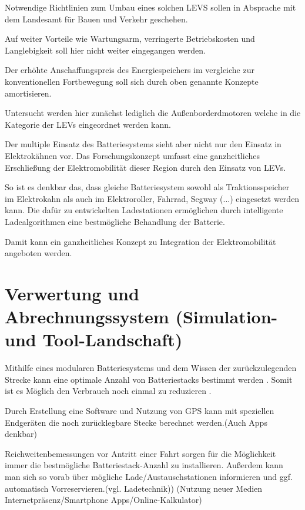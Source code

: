 Notwendige Richtlinien zum Umbau eines solchen LEVS sollen in Absprache mit dem Landesamt für Bauen und Verkehr geschehen. 

Auf weiter Vorteile wie Wartungsarm, verringerte Betriebskosten und Langlebigkeit soll hier nicht weiter eingegangen werden. 

Der erhöhte Anschaffungspreis des Energiespeichers im vergleiche zur konventionellen Fortbewegung soll sich durch oben genannte Konzepte amortisieren.

Untersucht werden hier zunächst lediglich die Außenborderdmotoren welche in die Kategorie der LEVs eingeordnet werden kann.

Der multiple Einsatz des Batteriesystems sieht aber nicht nur den Einsatz in Elektrokähnen vor.
Das Forschungskonzept umfasst eine ganzheitliches Erschließung der Elektromobilität dieser Region durch den Einsatz von LEVs.

So ist es denkbar das, dass gleiche Batteriesystem sowohl als Traktionsspeicher im Elektrokahn als auch im Elektroroller, Fahrrad, Segway (...) eingesetzt werden kann. Die dafür zu entwickelten Ladestationen ermöglichen durch intelligente Ladealgorithmen eine bestmögliche Behandlung der Batterie. 

Damit kann ein ganzheitliches Konzept zu Integration der Elektromobilität angeboten werden.


\section{Verwertung und Abrechnungssystem (Simulation- und Tool-Landschaft)}

Mithilfe eines modularen Batteriesystems und dem  Wissen der zurückzulegenden Strecke kann eine optimale Anzahl von Batteriestacks bestimmt werden . Somit ist es Möglich den Verbrauch noch einmal zu reduzieren . %

Durch Erstellung eine Software und Nutzung von GPS kann mit speziellen Endgeräten die noch zurücklegbare Stecke berechnet werden.(Auch Apps denkbar)

Reichweitenbemessungen vor Antritt einer Fahrt sorgen für die Möglichkeit immer die bestmögliche Batteriestack-Anzahl zu installieren. Außerdem kann man sich so vorab über mögliche Lade/Austauschstationen informieren und ggf. automatisch Vorreservieren.(vgl. Ladetechnik)) (Nutzung neuer Medien Internetpräsenz/Smartphone Apps/Online-Kalkulator)

